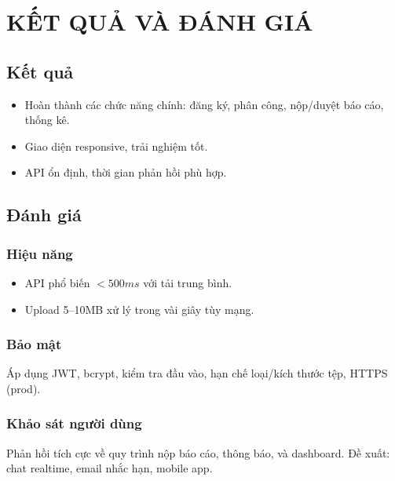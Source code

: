 \chapter{KẾT QUẢ VÀ ĐÁNH GIÁ}

\section{Kết quả}
\begin{itemize}
  \item Hoàn thành các chức năng chính: đăng ký, phân công, nộp/duyệt báo cáo, thống kê.
  \item Giao diện responsive, trải nghiệm tốt.
  \item API ổn định, thời gian phản hồi phù hợp.
\end{itemize}

\section{Đánh giá}
\subsection{Hiệu năng}
\begin{itemize}
  \item API phổ biến \(<500ms\) với tải trung bình.
  \item Upload 5–10MB xử lý trong vài giây tùy mạng.
\end{itemize}

\subsection{Bảo mật}
Áp dụng JWT, bcrypt, kiểm tra đầu vào, hạn chế loại/kích thước tệp, HTTPS (prod).

\subsection{Khảo sát người dùng}
Phản hồi tích cực về quy trình nộp báo cáo, thông báo, và dashboard. Đề xuất: chat realtime, email nhắc hạn, mobile app.
